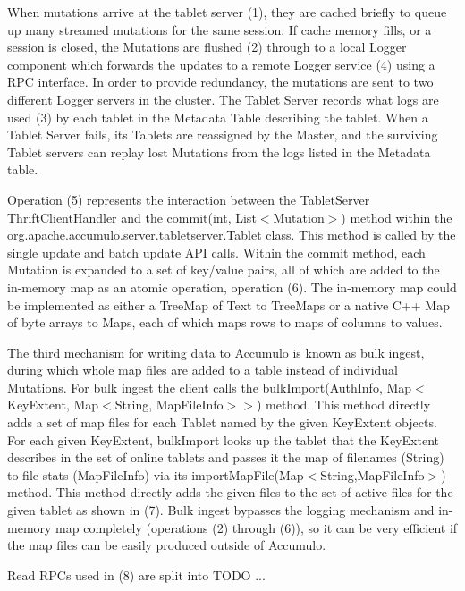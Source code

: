 \documentclass[letterpaper,onecolumn,12pt,titlepage]{article}
\begin{document}

When mutations arrive at the tablet server (1), they are cached briefly to queue up many streamed mutations for the same session.
If cache memory fills, or a session is closed, the Mutations are flushed (2) through to a local Logger component which 
forwards the updates to a remote Logger service (4) using a RPC interface. 
In order to provide redundancy, the mutations are sent to two different Logger servers in the cluster.
The Tablet Server records what logs are used (3) by each tablet in the Metadata Table describing the tablet.
When a Tablet Server fails, its Tablets are reassigned by the Master, 
and the surviving Tablet servers can replay lost Mutations from the logs listed in the Metadata table.


Operation (5) represents the interaction between the TabletServer ThriftClientHandler and the commit(int, List$<$Mutation$>$) method within the org.apache.accumulo.server.tabletserver.Tablet class.
This method is called by the single update and batch update API calls.
Within the commit method, each Mutation is expanded to a set of key/value pairs, all of which are added to the in-memory map as an atomic operation, operation (6).
The in-memory map could be implemented as either a TreeMap of Text to TreeMaps or a native C++ Map of byte arrays to Maps, each of which maps rows to maps of columns to values.

The third mechanism for writing data to Accumulo is known as bulk ingest, during which whole map files are added to a table instead of individual Mutations.
For bulk ingest the client calls the bulkImport(AuthInfo, Map$<$KeyExtent, Map$<$String, MapFileInfo$>$$>$) method.
This method directly adds a set of map files for each Tablet named by the given KeyExtent objects.
For each given KeyExtent, bulkImport looks up the tablet that the KeyExtent describes in the set of online tablets and passes it the map of filenames (String) to file stats (MapFileInfo) via its importMapFile(Map$<$String,MapFileInfo$>$) method.
This method directly adds the given files to the set of active files for the given tablet as shown in (7).
Bulk ingest bypasses the logging mechanism and in-memory map completely (operations (2) through (6)), so it can be very efficient if the map files can be easily produced outside of Accumulo.

Read RPCs used in (8) are split into TODO ...
\end{document}
